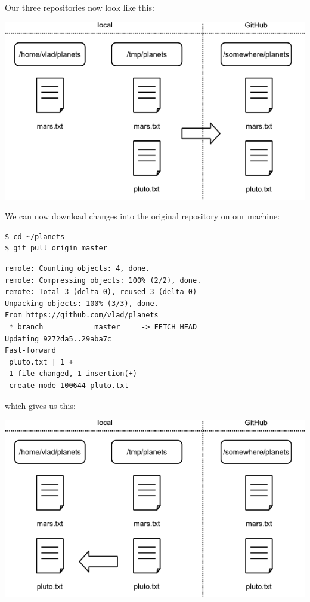 \documentclass{book}
\begin{document}
Our three repositories now look like this:

\includegraphics{novice/git/img/git-after-change-to-duplicate-repo.png}

We can now download changes into the original repository on our machine:

\begin{verbatim}
$ cd ~/planets
$ git pull origin master
\end{verbatim}

\begin{verbatim}
remote: Counting objects: 4, done.
remote: Compressing objects: 100% (2/2), done.
remote: Total 3 (delta 0), reused 3 (delta 0)
Unpacking objects: 100% (3/3), done.
From https://github.com/vlad/planets
 * branch            master     -> FETCH_HEAD
Updating 9272da5..29aba7c
Fast-forward
 pluto.txt | 1 +
 1 file changed, 1 insertion(+)
 create mode 100644 pluto.txt
\end{verbatim}

which gives us this:

\includegraphics{novice/git/img/git-after-pulling-to-local-repo.png}
\end{document}
